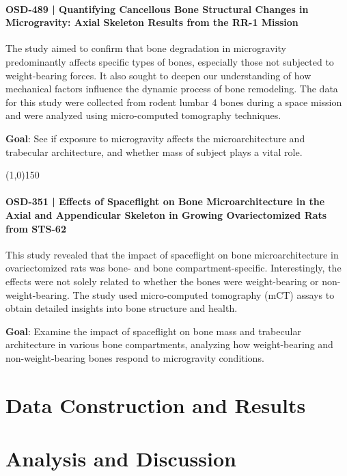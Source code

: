 \documentclass{article}
\begin{document}
\paragraph{OSD-489 | Quantifying Cancellous Bone Structural Changes in Microgravity: Axial Skeleton Results from the RR-1 Mission}
The study aimed to confirm that bone degradation in microgravity predominantly affects specific types of bones, especially those not subjected to weight-bearing forces. It also sought to deepen our understanding of how mechanical factors influence the dynamic process of bone remodeling. The data for this study were collected from rodent lumbar 4 bones during a space mission and were analyzed using micro-computed tomography techniques.

\quad\quad\textbf{Goal}: See if exposure to microgravity affects the microarchitecture and trabecular architecture, and whether mass of subject plays a vital role.

\begin{center}
  \line(1,0){150}
\end{center}

\paragraph{OSD-351 | Effects of Spaceflight on Bone Microarchitecture in the Axial and Appendicular Skeleton in Growing Ovariectomized Rats from STS-62}
This study revealed that the impact of spaceflight on bone microarchitecture in ovariectomized rats was bone- and bone compartment-specific. Interestingly, the effects were not solely related to whether the bones were weight-bearing or non-weight-bearing. The study used micro-computed tomography (mCT) assays to obtain detailed insights into bone structure and health.

\quad\quad\textbf{Goal}:  Examine the impact of spaceflight on bone mass and trabecular architecture in various bone compartments, analyzing how weight-bearing and non-weight-bearing bones respond to microgravity conditions.




\section{Data Construction and Results}


\section{Analysis and Discussion}
\end{document}
